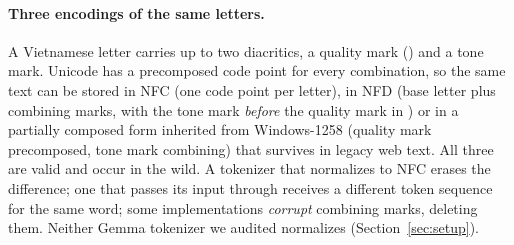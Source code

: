 \paragraph{Three encodings of the same letters.}
A Vietnamese letter carries up to two diacritics, a quality mark () and a tone mark. Unicode has a precomposed code point for every combination, so the same text can be stored in NFC (one code point per letter), in NFD (base letter plus combining marks, with the tone mark \emph{before} the quality mark in ) or in a partially composed form inherited from Windows-1258 (quality mark precomposed, tone mark combining) that survives in legacy web text. All three are valid and occur in the wild. A tokenizer that normalizes to NFC erases the difference; one that passes its input through receives a different token sequence for the same word; some implementations \emph{corrupt} combining marks, deleting them. Neither Gemma tokenizer we audited normalizes (Section~\ref{sec:setup}).

